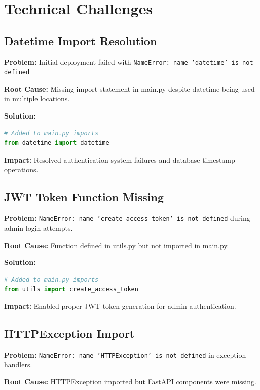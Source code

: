 \documentclass[11pt,a4paper]{article}
\begin{document}
\newpage

\section{Technical Challenges}
\label{sec:challenges}

\subsection{Datetime Import Resolution}

\textbf{Problem:} Initial deployment failed with \texttt{NameError: name 'datetime' is not defined}

\textbf{Root Cause:} Missing import statement in main.py despite datetime being used in multiple locations.

\textbf{Solution:}
\begin{lstlisting}[language=Python]
# Added to main.py imports
from datetime import datetime
\end{lstlisting}

\textbf{Impact:} Resolved authentication system failures and database timestamp operations.

\subsection{JWT Token Function Missing}

\textbf{Problem:} \texttt{NameError: name 'create\_access\_token' is not defined} during admin login attempts.

\textbf{Root Cause:} Function defined in utils.py but not imported in main.py.

\textbf{Solution:}
\begin{lstlisting}[language=Python]
# Added to main.py imports
from utils import create_access_token
\end{lstlisting}

\textbf{Impact:} Enabled proper JWT token generation for admin authentication.

\subsection{HTTPException Import}

\textbf{Problem:} \texttt{NameError: name 'HTTPException' is not defined} in exception handlers.

\textbf{Root Cause:} HTTPException imported but FastAPI components were missing.
\end{document}
